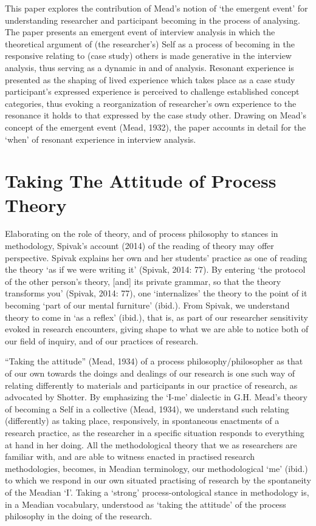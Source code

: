 This paper explores the contribution of Mead’s notion of ‘the emergent event’ for understanding researcher and participant becoming in the process of analysing. The paper presents an emergent event of interview analysis in which the theoretical argument of (the researcher’s) Self as a process of becoming in the responsive relating to (case study) others is made generative in the interview analysis, thus serving as a dynamic in and of analysis. Resonant experience is presented as the shaping of lived experience which takes place as a case study participant’s expressed experience is perceived to challenge established concept categories, thus evoking a reorganization of researcher’s own experience to the resonance it holds to that expressed by the case study other. Drawing on Mead’s concept of the emergent event (Mead, 1932), the paper accounts in detail for the ‘when’ of resonant experience in interview analysis. 

\section{Taking The Attitude of Process Theory}
Elaborating on the role of theory, and of process philosophy to stances in methodology, Spivak’s account (2014) of the reading of theory may offer perspective. Spivak explains her own and her students’ practice as one of reading the theory ‘as if we were writing it’ (Spivak, 2014: 77). By entering ‘the protocol of the other person’s theory, [and] its private grammar, so that the theory transforms you’ (Spivak, 2014: 77), one ‘internalizes’ the theory to the point of it becoming ‘part of our mental furniture’ (ibid.). From Spivak, we understand theory to come in ‘as a reflex’ (ibid.), that is, as part of our researcher sensitivity evoked in research encounters, giving shape to what we are able to notice both of our field of inquiry, and of our practices of research. 

\enquote{Taking the attitude} (Mead, 1934) of a process philosophy/philosopher as that of our own towards the doings and dealings of our research is one such way of relating differently to materials and participants in our practice of research, as advocated by Shotter. By emphasizing the ‘I-me’ dialectic in G.H. Mead’s theory of becoming a Self in a collective (Mead, 1934), we understand such relating (differently) as taking place, responsively, in spontaneous enactments of a research practice, as the researcher in a specific situation responds to everything at hand in her doing. All the methodological theory that we as researchers are familiar with, and are able to witness enacted in practised research methodologies, becomes, in Meadian terminology, our methodological ‘me’ (ibid.) to which we respond in our own situated practising of research by the spontaneity of the Meadian ‘I’. Taking a ‘strong’ process-ontological stance in methodology is, in a Meadian vocabulary, understood as ‘taking the attitude’ of the process philosophy in the doing of the research.


